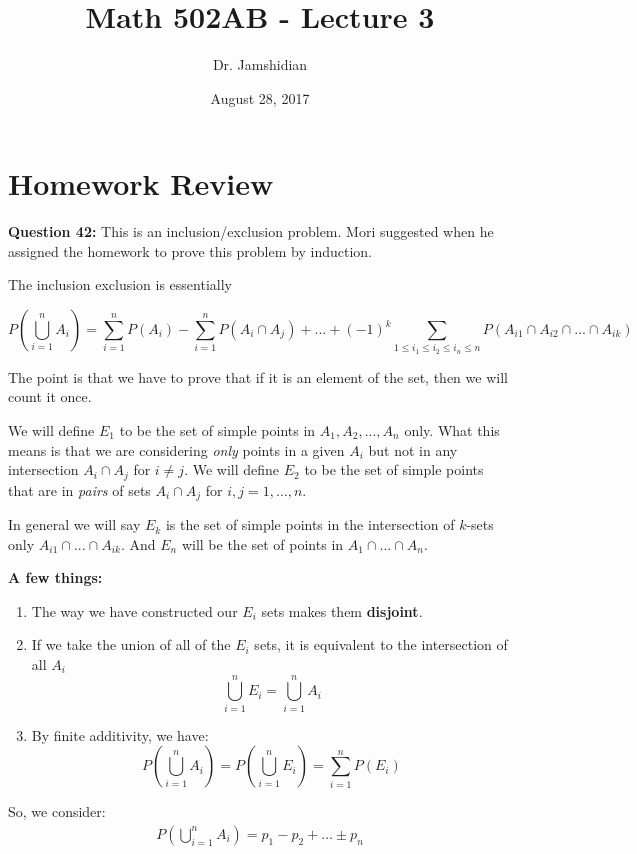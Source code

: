 \documentclass{article}
\title{Math 502AB - Lecture 3}
\author{Dr. Jamshidian}
\date{August 28, 2017}
\begin{document}
\maketitle

\section{Homework Review}

\textbf{Question 42:} This is an inclusion/exclusion problem. Mori suggested when he assigned the homework to prove this problem by induction. 

The inclusion exclusion is essentially

\begin{equation*}
    P\left(\bigcup\limits_{i=1}^n A_i\right) = \sum\limits_{i=1}^n P(A_i) - \sum\limits_{i=1}^n P(A_i \cap A_j) + ... + (-1)^k \sum\limits_{1\leq i_1 \leq i_2 \leq i_n \leq n} P\left(A_{i1} \cap A_{i2} \cap ... \cap A_{ik}\right)
\end{equation*}

The point is that we have to prove that if it is an element of the set, then we will count it once.

We will define $E_1$ to be the set of simple points in $A_1, A_2,...,A_n$ only. What this means is that we are considering \textit{only} points in a given $A_i$ but not in any intersection $A_i \cap A_j$ for $i\neq j$. We will define $E_2$ to be the set of simple points that are in \textit{pairs} of sets $A_i \cap A_j$ for $i,j = 1,...,n$. 

In general we will say $E_k$ is the set of simple points in the intersection of $k$-sets only $A_{i1} \cap ... \cap A_{ik}$. And $E_n$ will be the set of points in $A_1 \cap ... \cap A_n$.

\noindent\textbf{A few things:}
\begin{enumerate}
    \item The way we have constructed our $E_i$ sets makes them \textbf{disjoint}.
    \item If we take the union of all of the $E_i$ sets, it is equivalent to the intersection of all $A_i$
    \begin{equation*}
        \bigcup\limits_{i=1}^n E_i = \bigcup\limits_{i=1}^n A_i
    \end{equation*}
    
    \item By finite additivity, we have:
     \begin{equation*}
        P\left(\bigcup\limits_{i=1}^n A_i\right) = P\left(\bigcup\limits_{i=1}^n E_i \right) = \sum\limits_{i=1}^n P(E_i)
    \end{equation*}
    \end{enumerate}
    So, we consider:
    \begin{equation*}
    \begin{split}
         P\left(\bigcup\limits_{i=1}^n A_i\right) = p_1 - p_2 + ... \pm p_n
    \end{split}
    \end{equation*}
    
\end{document}
